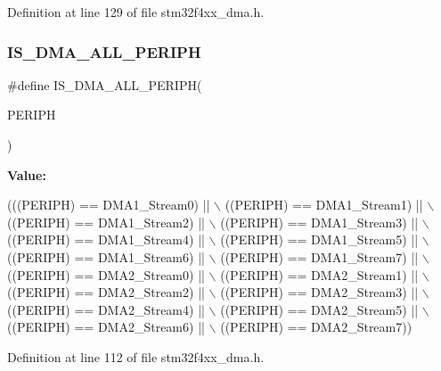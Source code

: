 Definition at line 129 of file stm32f4xx\+\_\+dma.\+h.

\mbox{\label{group___d_m_a___exported___constants_gabcab9fa1c48b148703a8f41c1d99e0c8}} 
\subsubsection{\texorpdfstring{I\+S\+\_\+\+D\+M\+A\+\_\+\+A\+L\+L\+\_\+\+P\+E\+R\+I\+PH}{IS\_DMA\_ALL\_PERIPH}}
{\footnotesize\ttfamily \#define I\+S\+\_\+\+D\+M\+A\+\_\+\+A\+L\+L\+\_\+\+P\+E\+R\+I\+PH(\begin{DoxyParamCaption}\item[{}]{P\+E\+R\+I\+PH }\end{DoxyParamCaption})}

{\bfseries Value\+:}
\begin{DoxyCode}
(((PERIPH) == DMA1\_Stream0) || \(\backslash\)
                                   ((PERIPH) == DMA1\_Stream1) || \(\backslash\)
                                   ((PERIPH) == DMA1\_Stream2) || \(\backslash\)
                                   ((PERIPH) == DMA1\_Stream3) || \(\backslash\)
                                   ((PERIPH) == DMA1\_Stream4) || \(\backslash\)
                                   ((PERIPH) == DMA1\_Stream5) || \(\backslash\)
                                   ((PERIPH) == DMA1\_Stream6) || \(\backslash\)
                                   ((PERIPH) == DMA1\_Stream7) || \(\backslash\)
                                   ((PERIPH) == DMA2\_Stream0) || \(\backslash\)
                                   ((PERIPH) == DMA2\_Stream1) || \(\backslash\)
                                   ((PERIPH) == DMA2\_Stream2) || \(\backslash\)
                                   ((PERIPH) == DMA2\_Stream3) || \(\backslash\)
                                   ((PERIPH) == DMA2\_Stream4) || \(\backslash\)
                                   ((PERIPH) == DMA2\_Stream5) || \(\backslash\)
                                   ((PERIPH) == DMA2\_Stream6) || \(\backslash\)
                                   ((PERIPH) == DMA2\_Stream7))
\end{DoxyCode}


Definition at line 112 of file stm32f4xx\+\_\+dma.\+h.

